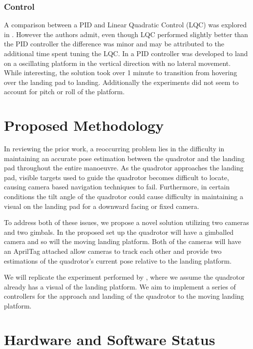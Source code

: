 \documentclass{article}[12pt]
\begin{document}
\subsubsection*{Control}
A comparison between a PID and Linear Quadratic Control (LQC) was explored in \cite{Friis2009}. However the authors admit, even though LQC performed slightly better than the PID controller the difference was minor and may be attributed to the additional time spent tuning the LQC. In \cite{Herisse2012} a PID controller was developed to land on a oscillating platform in the vertical direction with no lateral movement. While interesting, the solution took over 1 minute to transition from hovering over the landing pad to landing. Additionally the experiments did not seem to account for pitch or roll of the platform.  



\section*{Proposed Methodology}

In reviewing the prior work, a reoccurring problem lies in the difficulty in maintaining an accurate pose estimation between the quadrotor and the landing pad throughout the entire manoeuvre. As the quadrotor approaches the landing pad, visible targets used to guide the quadrotor becomes difficult to locate, causing camera based navigation techniques to fail. Furthermore, in certain conditions the tilt angle of the quadrotor could cause difficulty in maintaining a visual on the landing pad for a downward facing or fixed camera. 

To address both of these issues, we propose a novel solution utilizing two cameras and two gimbals. In the proposed set up the quadrotor will have a gimballed camera and so will the moving landing platform. Both of the cameras will have an AprilTag attached allow cameras to track each other and provide two estimations of the quadrotor's current pose relative to the landing platform. 

We will replicate the experiment performed by \cite{Ling2014}, where we assume the quadrotor already has a visual of the landing platform. We aim to implement a series of controllers for the approach and landing of the quadrotor to the moving landing platform.

\section*{Hardware and Software Status}
\end{document}
